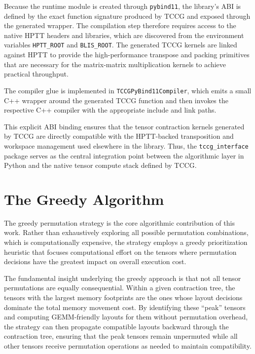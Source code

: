 Because the runtime module is created through \texttt{pybind11}, the library's ABI is defined by the exact function signature produced by \ac{TCCG} and exposed through the generated wrapper. The compilation step therefore requires access to the native \ac{HPTT} headers and libraries, which are discovered from the environment variables \texttt{HPTT\_ROOT} and \texttt{BLIS\_ROOT}. The generated \ac{TCCG} kernels are linked against \ac{HPTT} to provide the high-performance transpose and packing primitives that are necessary for the matrix-matrix multiplication kernels to achieve practical throughput.

The compiler glue is implemented in \texttt{TCCGPyBind11Compiler}, which emits a small C++ wrapper around the generated \ac{TCCG} function and then invokes the respective C++ compiler with the appropriate include and link paths. 

This explicit ABI binding ensures that the tensor contraction kernels generated by \ac{TCCG} are directly compatible with the \ac{HPTT}-backed transposition and workspace management used elsewhere in the library. Thus, the \texttt{tccg\_interface} package serves as the central integration point between the algorithmic layer in Python and the native tensor compute stack defined by \ac{TCCG}.

\section{The Greedy Algorithm}

The greedy permutation strategy is the core algorithmic contribution of this work. Rather than exhaustively exploring all possible permutation combinations, which is computationally expensive, the strategy employs a greedy prioritization heuristic that focuses computational effort on the tensors where permutation decisions have the greatest impact on overall execution cost.

The fundamental insight underlying the greedy approach is that not all tensor permutations are equally consequential. Within a given contraction tree, the tensors with the largest memory footprints are the ones whose layout decisions dominate the total memory movement cost. By identifying these ``peak'' tensors and computing \ac{GEMM}-friendly layouts for them without permutation overhead, the strategy can then propagate compatible layouts backward through the contraction tree, ensuring that the peak tensors remain unpermuted while all other tensors receive permutation operations as needed to maintain compatibility.

